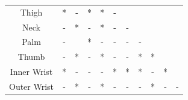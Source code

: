 \begin{table}[!h]
{\begin{tabular}{|c|c|ccccccccc}
Thigh       & *     & \multicolumn{1}{c|}{-}                                                   & \multicolumn{1}{c|}{*}                                                    & \multicolumn{1}{c|}{*}                                                   & \multicolumn{1}{c|}{-}   &                            &                           &                           &                            &                                                                            \\ \cline{1-7}
Neck        & -     & \multicolumn{1}{c|}{*}                                                   & \multicolumn{1}{c|}{-}                                                    & \multicolumn{1}{c|}{*}                                                   & \multicolumn{1}{c|}{-}   & \multicolumn{1}{c|}{-}     &                           &                           &                            &                                                                            \\ \cline{1-8}
Palm        & -     & \multicolumn{1}{c|}{}                                                    & \multicolumn{1}{c|}{*}                                                    & \multicolumn{1}{c|}{-}                                                   & \multicolumn{1}{c|}{-}   & \multicolumn{1}{c|}{-}     & \multicolumn{1}{c|}{-}    &                           &                            &                                                                            \\ \cline{1-9}
Thumb       & -     & \multicolumn{1}{c|}{*}                                                   & \multicolumn{1}{c|}{-}                                                    & \multicolumn{1}{c|}{*}                                                   & \multicolumn{1}{c|}{-}   & \multicolumn{1}{c|}{-}     & \multicolumn{1}{c|}{*}    & \multicolumn{1}{c|}{*}    &                            &                                                                            \\ \cline{1-10}
Inner Wrist & *     & \multicolumn{1}{c|}{-}                                                   & \multicolumn{1}{c|}{-}                                                    & \multicolumn{1}{c|}{-}                                                   & \multicolumn{1}{c|}{*}   & \multicolumn{1}{c|}{*}     & \multicolumn{1}{c|}{*}    & \multicolumn{1}{c|}{-}    & \multicolumn{1}{c|}{*}     &                                                                            \\ \hline
Outer Wrist & -     & \multicolumn{1}{c|}{*}                                                   & \multicolumn{1}{c|}{-}                                                    & \multicolumn{1}{c|}{*}                                                   & \multicolumn{1}{c|}{-}   & \multicolumn{1}{c|}{-}     & \multicolumn{1}{c|}{-}    & \multicolumn{1}{c|}{*}    & \multicolumn{1}{c|}{-}     & \multicolumn{1}{c|}{-}                                                     \\ \hline

\end{tabular}}
\end{table}
